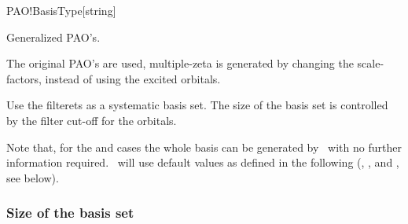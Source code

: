 \begin{fdfentry}{PAO!BasisType}[string]
\begin{fdfoptions}
    \option[nodes]%
    
    Generalized PAO's.


    \option[nodes]%

    The original PAO's are used, multiple-zeta is generated by
    changing the scale-factors, instead of using the excited orbitals.

    
    \option[filteret]
    
    Use the filterets as a systematic basis set.  The size of the
    basis set is controlled by the filter cut-off for the orbitals.
    
  \end{fdfoptions}
  
  \noindent
  Note that, for the  and  cases the whole
  basis can be generated by \siesta\ with no further information
  required. \siesta\ will use default values as defined in the
  following (, , and
  , see below).
  
\end{fdfentry}


\subsubsection{Size of the basis set}

